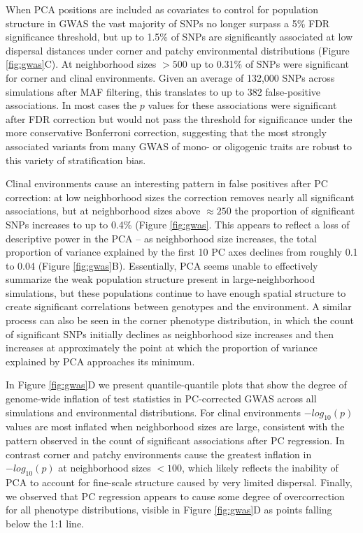 \documentclass[11pt,twoside,lineno]{preprint}
\begin{document}
When PCA positions are included as covariates to control for population structure in GWAS the vast majority of SNPs no longer surpass a 5\% FDR significance threshold, but up to 1.5\% of SNPs are significantly associated at low dispersal distances under corner and patchy environmental distributions (Figure \ref{fig:gwas}C). At neighborhood sizes $> 500$ up to 0.31\% of SNPs were significant for corner and clinal environments. Given an average of 132,000 SNPs across simulations after MAF filtering, this translates to up to 382 false-positive associations. In most cases the $p$ values for these associations were significant after FDR correction but would not pass the threshold for significance under the more conservative Bonferroni correction, suggesting that the most strongly associated variants from many GWAS of mono- or oligogenic traits are robust to this variety of stratification bias. 

Clinal environments cause an interesting pattern in false positives after PC correction: at low neighborhood sizes the correction removes nearly all significant associations, but at neighborhood sizes above $\approx250$ the proportion of significant SNPs increases to up to 0.4\% (Figure \ref{fig:gwas}. This appears to reflect a loss of descriptive power in the PCA -- as neighborhood size increases, the total proportion of variance explained by the first 10 PC axes declines from roughly 0.1 to 0.04 (Figure \ref{fig:gwas}B). Essentially, PCA seems unable to effectively summarize the weak population structure present in large-neighborhood simulations, but these populations continue to have enough spatial structure to create significant correlations between genotypes and the environment. A similar process can also be seen in the corner phenotype distribution, in which the count of significant SNPs initially declines as neighborhood size increases and then increases at approximately the point at which the proportion of variance explained by PCA approaches its minimum. 

In Figure \ref{fig:gwas}D we present quantile-quantile plots that show the degree of genome-wide inflation of test statistics in PC-corrected GWAS across all simulations and environmental distributions. For clinal environments $-log_{10}(p)$ values are most inflated when neighborhood sizes are large, consistent with the pattern observed in the count of significant associations after PC regression. In contrast corner and patchy environments cause the greatest inflation in $-log_{10}(p)$ at neighborhood sizes $<100$, which likely reflects the inability of PCA to account for fine-scale structure caused by very limited dispersal. Finally, we observed that PC regression appears to cause some degree of overcorrection for all phenotype distributions, visible in Figure \ref{fig:gwas}D as points falling below the 1:1 line.
\end{document}
